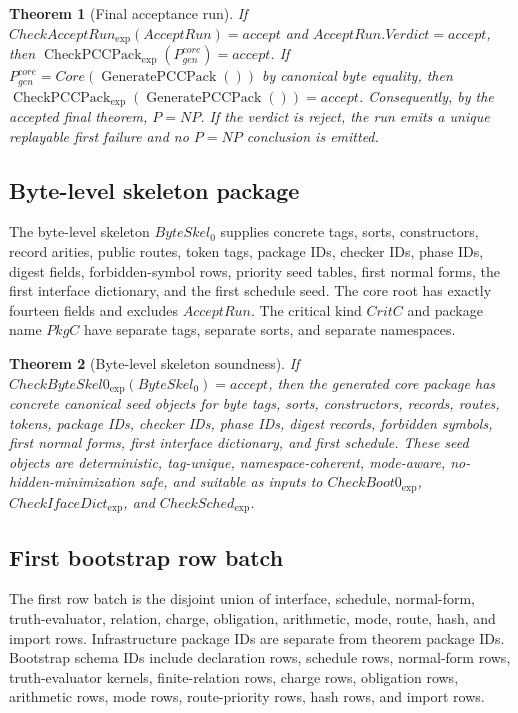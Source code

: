 \documentclass[10.5pt,a4paper]{article}
\newtheorem{theorem}{Theorem}[section]
\newcommand{\CheckPack}{\operatorname{CheckPCCPack}_{\exp}}
\newcommand{\GenPack}{\operatorname{GeneratePCCPack}}
\begin{document}
\begin{theorem}[Final acceptance run]
If \(CheckAcceptRun_{\exp}(AcceptRun)=accept\) and \(AcceptRun.Verdict=accept\), then \(\CheckPack(P^{core}_{gen})=accept\). If \(P^{core}_{gen}=Core(\GenPack())\) by canonical byte equality, then \(\CheckPack(\GenPack())=accept\). Consequently, by the accepted final theorem, \(P=NP\). If the verdict is reject, the run emits a unique replayable first failure and no \(P=NP\) conclusion is emitted.
\end{theorem}

\subsection{Byte-level skeleton package}
The byte-level skeleton \(ByteSkel_0\) supplies concrete tags, sorts, constructors, record arities, public routes, token tags, package IDs, checker IDs, phase IDs, digest fields, forbidden-symbol rows, priority seed tables, first normal forms, the first interface dictionary, and the first schedule seed. The core root has exactly fourteen fields and excludes \(AcceptRun\). The critical kind \(CritC\) and package name \(PkgC\) have separate tags, separate sorts, and separate namespaces.

\begin{theorem}[Byte-level skeleton soundness]
If \(CheckByteSkel0_{\exp}(ByteSkel_0)=accept\), then the generated core package has concrete canonical seed objects for byte tags, sorts, constructors, records, routes, tokens, package IDs, checker IDs, phase IDs, digest records, forbidden symbols, first normal forms, first interface dictionary, and first schedule. These seed objects are deterministic, tag-unique, namespace-coherent, mode-aware, no-hidden-minimization safe, and suitable as inputs to \(CheckBoot0_{\exp}\), \(CheckIfaceDict_{\exp}\), and \(CheckSched_{\exp}\).
\end{theorem}

\subsection{First bootstrap row batch}
The first row batch is the disjoint union of interface, schedule, normal-form, truth-evaluator, relation, charge, obligation, arithmetic, mode, route, hash, and import rows. Infrastructure package IDs are separate from theorem package IDs. Bootstrap schema IDs include declaration rows, schedule rows, normal-form rows, truth-evaluator kernels, finite-relation rows, charge rows, obligation rows, arithmetic rows, mode rows, route-priority rows, hash rows, and import rows.
\end{document}

